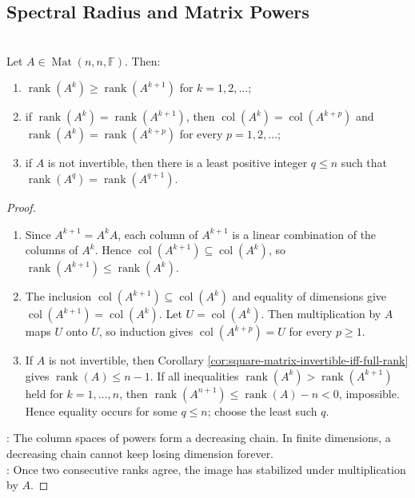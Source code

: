 \subsection{Spectral Radius and Matrix Powers}

\begin{theorem} \label{thm:ranks-of-matrix-powers-stabilize} \\
Let $A\in\operatorname{Mat}(n,n,\mathbb{F})$. Then:
\begin{enumerate}[label=(\roman*)]
\setlength{\itemsep}{0pt}
\item $\operatorname{rank}(A^k)\geq\operatorname{rank}(A^{k+1})$ for $k=1,2,\ldots$;
\item if $\operatorname{rank}(A^k)=\operatorname{rank}(A^{k+1})$, then $\operatorname{col}(A^k)=\operatorname{col}(A^{k+p})$ and $\operatorname{rank}(A^k)=\operatorname{rank}(A^{k+p})$ for every $p=1,2,\ldots$;
\item if $A$ is not invertible, then there is a least positive integer $q\leq n$ such that $\operatorname{rank}(A^q)=\operatorname{rank}(A^{q+1})$.
\end{enumerate}
\begin{proof}
\begin{enumerate}[label=(\roman*)]
\setlength{\itemsep}{0pt}
\item Since $A^{k+1}=A^kA$, each column of $A^{k+1}$ is a linear combination of the columns of $A^k$. Hence $\operatorname{col}(A^{k+1})\subseteq\operatorname{col}(A^k)$, so $\operatorname{rank}(A^{k+1})\leq\operatorname{rank}(A^k)$.
\item The inclusion $\operatorname{col}(A^{k+1})\subseteq\operatorname{col}(A^k)$ and equality of dimensions give $\operatorname{col}(A^{k+1})=\operatorname{col}(A^k)$. Let $U=\operatorname{col}(A^k)$. Then multiplication by $A$ maps $U$ onto $U$, so induction gives $\operatorname{col}(A^{k+p})=U$ for every $p\geq1$.
\item If $A$ is not invertible, then Corollary \ref{cor:square-matrix-invertible-iff-full-rank} gives $\operatorname{rank}(A)\leq n-1$. If all inequalities $\operatorname{rank}(A^k)>\operatorname{rank}(A^{k+1})$ held for $k=1,\ldots,n$, then $\operatorname{rank}(A^{n+1})\leq\operatorname{rank}(A)-n<0$, impossible. Hence equality occurs for some $q\leq n$; choose the least such $q$.
\end{enumerate}
: The column spaces of powers form a decreasing chain. In finite dimensions, a decreasing chain cannot keep losing dimension forever.\\
: Once two consecutive ranks agree, the image has stabilized under multiplication by $A$.
\end{proof}
\end{theorem}

